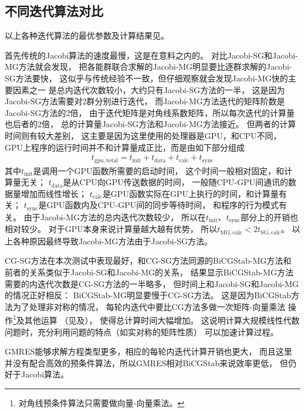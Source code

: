 \subsection{不同迭代算法对比}

以上各种迭代算法的最优参数及计算结果见。

首先传统的Jacobi算法的速度最慢，这是在意料之内的。
对比Jacobi-SG和Jacobi-MG方法就会发现，
把各能群联合求解的Jacobi-MG明显要比逐群求解的Jacobi-SG方法要快，
这似乎与传统经验不一致，但仔细观察就会发现Jacobi-MG快的主要因素之一
是总内迭代次数较小，大约只有Jacobi-SG方法的一半，
这是因为Jacobi-SG方法需要对2群分别进行迭代，
而Jacobi-MG方法迭代的矩阵阶数是Jacobi-SG方法的2倍，
由于迭代矩阵是对角线系数矩阵，所以每次迭代的计算量也后者的2倍，
总的计算量Jacobi-SG方法和Jacobi-MG方法接近。
但两者的计算时间则有较大差别，
这主要是因为这里使用的处理器是GPU，和CPU不同，
GPU上程序的运行时间并不和计算量成正比，而是由如下部分组成
\begin{align}
  t_\mathrm{gpu,total} = t_\mathrm{init} + t_\mathrm{data} + t_\mathrm{calc} + t_\mathrm{sync}
\end{align}
其中$t_\mathrm{init}$是调用一个GPU函数所需要的启动时间，
这个时间一般相对固定，和计算量无关；
$t_\mathrm{data}$是从CPU向GPU传送数据的时间，
一般随CPU-GPU间通讯的数据量增加而线性增长；
$t_\mathrm{calc}$是GPU函数实际在GPU上执行的时间，和计算量有关；
$t_\mathrm{sync}$是GPU函数内及CPU-GPU间的同步等待时间，
和程序的行为模式有关。
由于Jacobi-MG方法的总内迭代次数较少，
所以在$t_\mathrm{init}$、$t_\mathrm{sync}$部分上的开销也相对较少。
对于GPU本身来说计算量越大越有优势，
所以$t_\mathrm{MG,calc}<2t_\mathrm{SG,calc}$。
以上各种原因最终导致Jacobi-MG方法由于Jacobi-SG方法。

CG-SG方法在本次测试中表现最好，和CG-SG方法同源的BiCGStab-MG方法和
前者的关系类似于Jacobi-SG和Jacobi-MG的关系，
结果显示BiCGStab-MG方法需要的内迭代次数是CG-SG方法的一半略多，
但时间上和Jacobi-SG和Jacobi-MG的情况正好相反：
BiCGStab-MG明显要慢于CG-SG方法。
这是因为BiCGStab方法为了处理非对称的情况，
每轮内迭代中要比CG方法多做一次矩阵-向量乘法
操作\footnote{对角线预条件算法只需要做向量-向量乘法。}及其他运算
（见及），
使得总计算时间大幅增加。
这说明计算大规模线性代数问题时，充分利用问题的特点（如实对称的矩阵性质）
可以加速计算过程。

GMRES能够求解方程类型更多，相应的每轮内迭代计算开销也更大，
而且这里并没有配合高效的预条件算法，所以GMRES相对BiCGStab来说效率更低，
但仍好于Jacobi算法。

